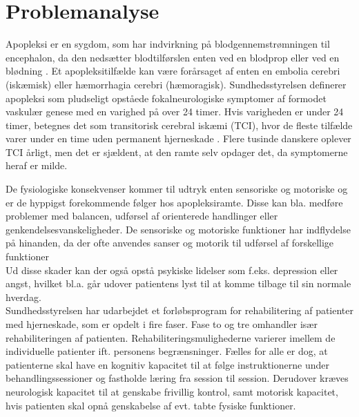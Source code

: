 \chapter{Problemanalyse}
Apopleksi er en sygdom, som har indvirkning på blodgennemstrømningen til encephalon, da den nedsætter blodtilførslen enten ved en blodprop eller ved en blødning \cite{Hjernesagen2015a}. Et apopleksitilfælde kan være forårsaget af enten en embolia cerebri (iskæmisk) eller hæmorrhagia cerebri (hæmoragisk). \cite{Ritter2015} Sundhedsstyrelsen definerer apopleksi som pludseligt opståede fokalneurologiske symptomer af formodet vaskulær genese med en varighed på over 24 timer.\cite{Sundhedsstyrelsen2009} Hvis varigheden er under 24 timer, betegnes det som transitorisk cerebral iskæmi (TCI), hvor de fleste tilfælde varer under en time uden permanent hjerneskade \cite{Ritter2015,Sundhed.dk2014}. Flere tusinde danskere oplever TCI årligt, men det er sjældent, at den ramte selv opdager det, da symptomerne heraf er milde. \cite{Hjernesagen2015a,Academic2015} 

De fysiologiske konsekvenser kommer til udtryk enten sensoriske og motoriske og er de hyppigst forekommende følger hos apopleksiramte. Disse kan bla. medføre problemer med balancen, udførsel af orienterede handlinger eller genkendelsesvanskeligheder. \cite{Kruuse2015a,DSfA2009}  De sensoriske og motoriske funktioner har indflydelse på hinanden, da der ofte anvendes sanser og motorik til udførsel af forskellige funktioner \cite{Nichols1997}\\
Ud disse skader kan der også opstå psykiske lidelser som f.eks. depression eller angst, hvilket bl.a. går udover patientens lyst til at komme tilbage til sin normale hverdag. \cite{Muus2008}\\

Sundhedsstyrelsen har udarbejdet et forløbsprogram for rehabilitering af patienter med hjerneskade, som er opdelt i fire faser. Fase to og tre omhandler især rehabiliteringen af patienten. \cite{Sundhedsstyrelsen2011a} Rehabiliteringsmulighederne varierer imellem de individuelle patienter ift. personens begrænsninger. Fælles for alle er dog, at patienterne skal have en kognitiv kapacitet til at følge instruktionerne under behandlingssessioner og fastholde læring fra session til session. Derudover kræves neurologisk kapacitet til at genskabe frivillig kontrol, samt motorisk kapacitet, hvis patienten skal opnå genskabelse af evt. tabte fysiske funktioner. \cite{Middaugh1989} 

